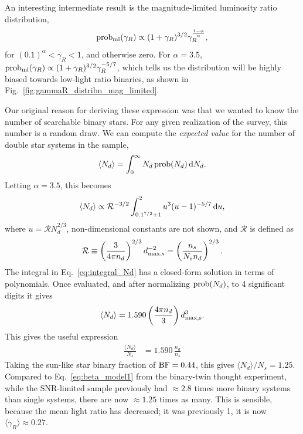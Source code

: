 \documentclass{emulateapj}
\begin{document}
An interesting intermediate result is the magnitude-limited luminosity ratio 
distribution,
\begin{equation}
{\rm prob_{ml}}(\gamma_R) \propto (1+\gamma_R)^{3/2} 
\gamma_R^{\frac{1-\alpha}{\alpha}},
\end{equation}
for $(0.1)^{\alpha}<\gamma_R<1$, and otherwise zero.
For $\alpha=3.5$, ${\rm prob_{ml}}(\gamma_R) \propto 
(1+\gamma_R)^{3/2}\gamma_R^{-5/7}$, which tells us the distribution will be 
highly biased towards low-light ratio binaries, as shown in 
Fig.~\ref{fig:gammaR_distribn_mag_limited}.

Our original reason for deriving these expression was that we wanted to know 
the number of searchable binary stars.
For any given realization of the survey, this number is a random draw.
We can compute the \textit{expected value} for the number of double star 
systems in the sample,
\begin{equation}
\langle N_d \rangle = \int_{0}^{\infty} N_d\, {\rm prob}(N_d) \,{\rm d}N_d.
\end{equation}
Letting $\alpha=3.5$, this becomes
\begin{equation}
\langle N_d \rangle \propto \mathcal{R}^{-3/2}
\int_{0.1^{7/2} + 1}^{2} u^3 (u-1)^{-5/7} \,{\rm d}u ,
\label{eq:integral_Nd}
\end{equation}
where $u = \mathcal{R} N_d^{2/3}$,
non-dimensional constants are not shown,
and $\mathcal{R}$ is defined as
\begin{equation}
\mathcal{R} \equiv \left(\frac{3}{4\pi n_d}\right)^{2/3} d_{\rm max,s}^{-2}
= \left(\frac{n_s}{N_s n_d}\right)^{2/3}.
\end{equation}
The integral in Eq.~\ref{eq:integral_Nd} has a closed-form solution in terms 
of polynomials. Once evaluated, and after 
normalizing ${\rm prob}(N_d)$, to 4 significant digits it gives
\begin{equation}
\langle N_d \rangle = 1.590 \left(\frac{4\pi n_d}{3}\right) d_{\rm max,s}^3.
\end{equation}
This gives the useful expression
\begin{align}
\frac{\langle N_d \rangle}{N_s} &= 1.590\, \frac{n_d}{n_s}
\label{eq:beta_model2}
\end{align}
Taking the sun-like star binary fraction of ${\rm BF} = 0.44$, this gives
$\langle N_d \rangle / N_s = 1.25$.
Compared to Eq.~\ref{eq:beta_model1} from the binary-twin thought experiment, 
while the SNR-limited sample previously had $\approx 2.8$ times more binary 
systems than single systems, there are now $\approx 1.25$ times as many.
This is sensible, because the mean light ratio has decreased; it was 
previously 1, it is now $\langle \gamma_R \rangle \approx 0.27$.
\end{document}
